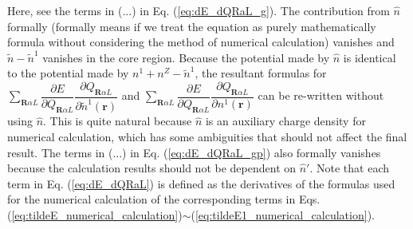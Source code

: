 \documentclass{article}
\begin{document}
Here, see the terms in (...) in Eq. (\ref{eq:dE_dQRaL_g}). The contribution from $\hat{n}$ formally (formally means if we treat the equation as purely mathematically formula without considering the method of numerical calculation) vanishes and $\widetilde{n} - \widetilde{n}^1$ vanishes in the core region. Because the potential made by $\hat{n}$ is identical to the potential made by $n^1+n^Z-\widetilde{n}^1$, the resultant formulas for 
$\sum_{\bm{R}\alpha L} \dfrac{\partial E}{\partial Q_{\bm{R}\alpha L}} 
   \dfrac{\partial Q_{\bm{R}\alpha L}}{\partial \widetilde{n}^1(\bm{r})}$
and 
$    \sum_{\bm{R}\alpha L} \dfrac{\partial E}{\partial Q_{\bm{R}\alpha L}} 
\dfrac{\partial Q_{\bm{R}\alpha L}}{\partial n^1(\bm{r})}$
can be re-written without using $\hat{n}$. This is quite natural because $\hat{n}$ is an auxiliary charge density for numerical calculation, which has some ambiguities that should not affect the final result.
The terms in 
(...) in Eq. (\ref{eq:dE_dQRaL_gp}) also formally vanishes because the calculation results should not be dependent on $\hat{n}'$.
Note that each term in Eq. (\ref{eq:dE_dQRaL}) is defined as the derivatives of the formulas used for the numerical calculation of the corresponding terms in Eqs. (\ref{eq:tildeE_numerical_calculation})$\sim$(\ref{eq:tildeE1_numerical_calculation}).
\end{document}

